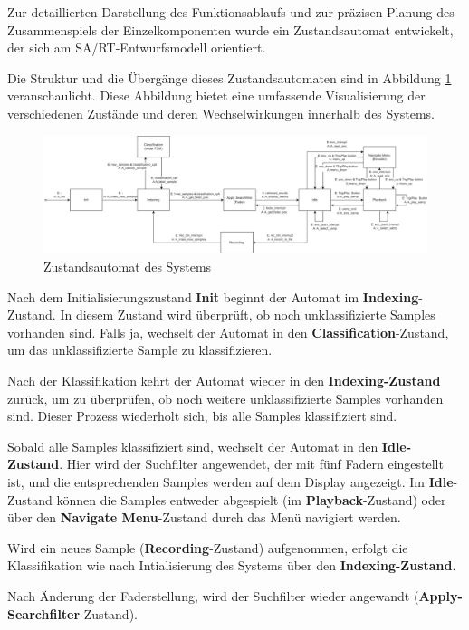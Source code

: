 Zur detaillierten Darstellung des Funktionsablaufs und zur präzisen Planung des Zusammenspiels der Einzelkomponenten wurde ein Zustandsautomat entwickelt, der sich am SA/RT-Entwurfsmodell orientiert. 

Die Struktur und die Übergänge dieses Zustandsautomaten sind in Abbildung \ref{fig:fsm} veranschaulicht. Diese Abbildung bietet eine umfassende Visualisierung der verschiedenen Zustände und deren Wechselwirkungen innerhalb des Systems.

\begin{figure}[H]
   	\centering
   	\includegraphics[width=1.0\textwidth]{images/04_spezifikation/fsm.drawio.png}
   	\caption{Zustandsautomat des Systems}
   	\label{fig:fsm}
\end{figure}

Nach dem Initialisierungszustand \textbf{Init} beginnt der Automat im \textbf{Indexing}-Zustand. In diesem Zustand wird überprüft, ob noch unklassifizierte Samples vorhanden sind. Falls ja, wechselt der Automat in den \textbf{Classification}-Zustand, um das unklassifizierte Sample zu klassifizieren. 

Nach der Klassifikation kehrt der Automat wieder in den \textbf{Indexing-Zustand} zurück, um zu überprüfen, ob noch weitere unklassifizierte Samples vorhanden sind. Dieser Prozess wiederholt sich, bis alle Samples klassifiziert sind.

Sobald alle Samples klassifiziert sind, wechselt der Automat in den \textbf{Idle-Zustand}. Hier wird der Suchfilter angewendet, der mit fünf Fadern eingestellt ist, und die entsprechenden Samples werden auf dem Display angezeigt. Im \textbf{Idle}-Zustand können die Samples entweder abgespielt (im \textbf{Playback}-Zustand) oder über den \textbf{Navigate Menu}-Zustand durch das Menü navigiert werden.

Wird ein neues Sample (\textbf{Recording}-Zustand) aufgenommen, erfolgt die Klassifikation wie nach Intialisierung des Systems über den \textbf{Indexing-Zustand}.

Nach Änderung der Faderstellung, wird der Suchfilter wieder angewandt (\textbf{Apply-Searchfilter}-Zustand).

